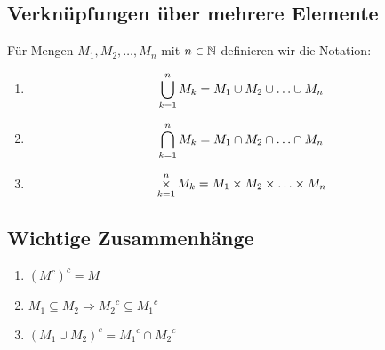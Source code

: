 \subsection{Verknüpfungen über mehrere Elemente}
Für Mengen $M_1, M_2, \ldots, M_n$ mit $n \in \mathbb{N}$ definieren wir die Notation:
\begin{enumerate}[label= (\alph*)]
    \item
        \begin{equation*}
            \mathop{\bigcup}\displaylimits_{k=1}^n M_k = M_1 \cup M_2 \cup \ldots \cup M_n
        \end{equation*}
    \item
        \begin{equation*}
            \mathop{\bigcap}\displaylimits_{k=1}^n M_k = M_1 \cap M_2 \cap \ldots \cap M_n
        \end{equation*}
    \item
        \begin{equation*}
            \mathop{\times}\displaylimits_{k=1}^n M_k = M_1 \times M_2 \times \ldots \times M_n
        \end{equation*}
\end{enumerate}

\subsection{Wichtige Zusammenhänge}
\begin{enumerate}[label= (\alph*)]
    \item ${(M^c)}^c = M$
    \item $M_1 \subseteq M_2 \Rightarrow {M_2}^c \subseteq {M_1}^c$
    \item ${(M_1 \cup M_2)}^c = {M_1}^c \cap {M_2}^c$
\end{enumerate}
